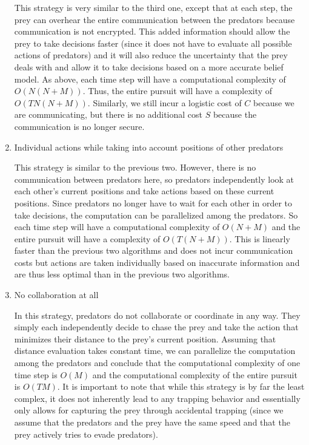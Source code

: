 \documentclass[11pt]{article}
\begin{document}
\begin{multicols}{2}
\begin{enumerate}[leftmargin=0.25cm]
	This strategy is very similar to the third one, except that at each step, the prey can overhear the entire communication between the predators because communication is not encrypted. This added information should allow the prey to take decisions faster (since it does not have to evaluate all possible actions of predators) and it will also reduce the uncertainty that the prey deals with and allow it to take decisions based on a more accurate belief model. As above, each time step will have a computational complexity of $O(N(N+M))$. Thus, the entire pursuit will have a complexity of $O(TN(N+M))$. Similarly, we still incur a logistic cost of $C$ because we are communicating, but there is no additional cost $S$ because the communication is no longer secure. 
	
	\item Individual actions while taking into account positions of other predators
	
	This strategy is similar to the previous two. However, there is no communication between predators here, so predators independently look at each other's current positions and take actions based on these current positions. Since predators no longer have to wait for each other in order to take decisions, the computation can be parallelized among the predators. So each time step will have a computational complexity of $O(N+M)$ and the entire pursuit will have a complexity of $O(T(N+M))$. This is linearly faster than the previous two algorithms and does not incur communication costs but actions are taken individually based on inaccurate information and are thus less optimal than in the previous two algorithms. 
	
	\item No collaboration at all
	
	In this strategy, predators do not collaborate or coordinate in any way. They simply each independently decide to chase the prey and take the action that minimizes their distance to the prey's current position. Assuming that distance evaluation takes constant time, we can parallelize the computation among the predators and conclude that the computational complexity of one time step is $O(M)$ and the computational complexity of the entire pursuit is $O(TM)$. It is important to note that while this strategy is by far the least complex, it does not inherently lead to any trapping behavior and essentially only allows for capturing the prey through accidental trapping (since we assume that the predators and the prey have the same speed and that the prey actively tries to evade predators).  
\end{enumerate}


\end{multicols}
\end{document}
